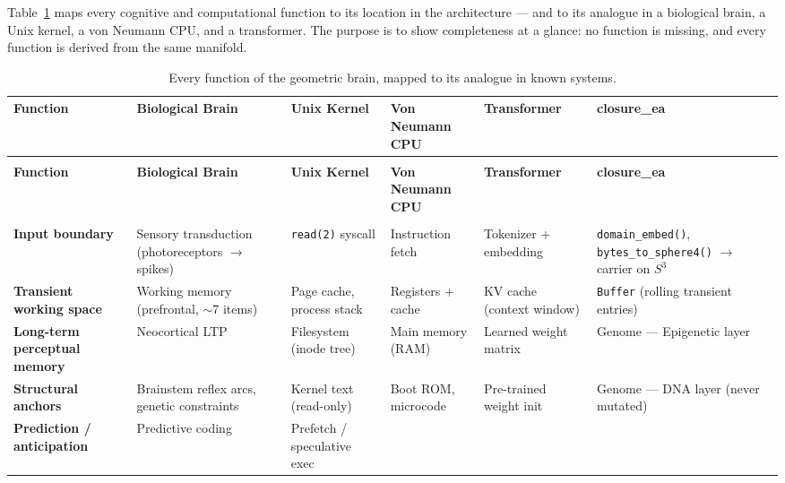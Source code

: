 \documentclass[12pt,a4paper]{article}
\theoremstyle{definition}
\theoremstyle{remark}
\begin{document}
Table~\ref{tab:comparison} maps every cognitive and computational function to
its location in the architecture --- and to its analogue in a biological
brain, a Unix kernel, a von Neumann CPU, and a transformer. The purpose is to
show completeness at a glance: no function is missing, and every function is
derived from the same manifold.

\begin{landscape}
\begin{longtable}{>{\bfseries\footnotesize}p{3.0cm}
                  >{\footnotesize}p{3.8cm}
                  >{\footnotesize}p{3.2cm}
                  >{\footnotesize}p{2.8cm}
                  >{\footnotesize}p{3.2cm}
                  >{\footnotesize}p{4.4cm}}
\caption{Every function of the geometric brain, mapped to its analogue in
known systems.}
\label{tab:comparison}\\
\toprule
\textbf{Function} & \textbf{Biological Brain} & \textbf{Unix Kernel} &
\textbf{Von Neumann CPU} & \textbf{Transformer} & \textbf{closure\_ea} \\
\midrule
\endfirsthead
\multicolumn{6}{c}{\tablename~\thetable{} (continued)}\\
\toprule
\textbf{Function} & \textbf{Biological Brain} & \textbf{Unix Kernel} &
\textbf{Von Neumann CPU} & \textbf{Transformer} & \textbf{closure\_ea} \\
\midrule
\endhead
\midrule\multicolumn{6}{r}{\footnotesize(continued on next page)}\\
\endfoot
\bottomrule
\endlastfoot
Input boundary &
  Sensory transduction (photoreceptors $\to$ spikes) &
  \texttt{read(2)} syscall &
  Instruction fetch &
  Tokenizer + embedding &
  \texttt{domain\_embed()}, \texttt{bytes\_to\_sphere4()} $\to$ carrier on $S^3$ \\[4pt]
Transient working space &
  Working memory (prefrontal, $\sim$7 items) &
  Page cache, process stack &
  Registers + cache &
  KV cache (context window) &
  \texttt{Buffer} (rolling transient entries) \\[4pt]
Long-term perceptual memory &
  Neocortical LTP &
  Filesystem (inode tree) &
  Main memory (RAM) &
  Learned weight matrix &
  Genome --- Epigenetic layer \\[4pt]
Structural anchors &
  Brainstem reflex arcs, genetic constraints &
  Kernel text (read-only) &
  Boot ROM, microcode &
  Pre-trained weight init &
  Genome --- DNA layer (never mutated) \\[4pt]
Prediction / anticipation &
  Predictive coding~\cite{rao1999} &
  Prefetch / speculative exec &

\end{longtable}
\end{landscape}
\end{document}
